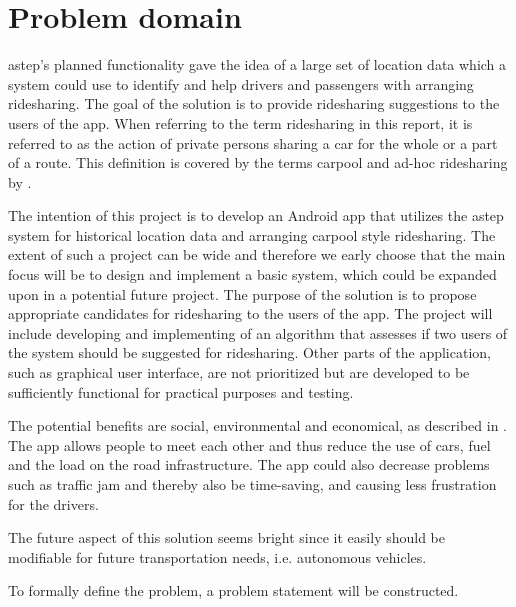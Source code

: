 \section{Problem domain}
\gls{astep}'s planned functionality gave the idea of a large set of location data which a system could use to identify and help drivers and passengers with arranging ridesharing.
The goal of the solution is to provide ridesharing suggestions to the users of the app.
When referring to the term ridesharing in this report, it is referred to as the action of private persons sharing a car for the whole or a part of a route. 
This definition is covered by the terms carpool and ad-hoc ridesharing by \citet{doi:10.1080/01441647.2011.621557}.  

The intention of this project is to develop an Android app that utilizes the \gls{astep} system for historical location data and arranging carpool style ridesharing.
The extent of such a project can be wide and therefore we early choose that the main focus will be to design and implement a basic system, which could be expanded upon in a potential future project.
The purpose of the solution is to propose appropriate candidates for ridesharing to the users of the app.
The project will include developing and implementing of an algorithm that assesses if two users of the system should be suggested for ridesharing.
Other parts of the application, such as graphical user interface, are not prioritized but are developed to be sufficiently functional for practical purposes and testing.

The potential benefits are social, environmental and economical, as described in \cite{doi:10.1080/01441647.2011.621557}.
The app allows people to meet each other and thus reduce the use of cars, fuel and the load on the road infrastructure.
The app could also decrease problems such as traffic jam and thereby also be time-saving, and causing less frustration for the drivers.

The future aspect of this solution seems bright since it easily should be modifiable for future transportation needs, i.e. autonomous vehicles.

To formally define the problem, a problem statement will be constructed.